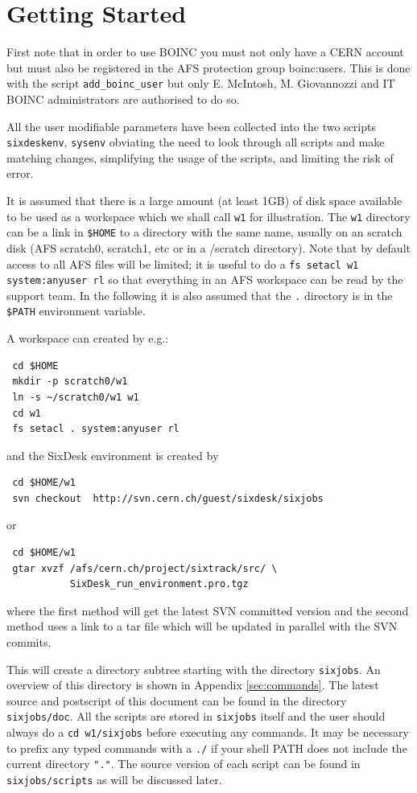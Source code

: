 \documentclass{cernatsnote}
\begin{document}
\section{Getting Started} First note that in order to use BOINC you must not
only have a CERN account but must also be registered in the AFS protection
group boinc:users. This is done with the script \texttt{add\_boinc\_user} but only
E. McIntosh, M. Giovannozzi and IT BOINC administrators are authorised to do
so.

All the user modifiable parameters have been collected into the two scripts
\texttt{sixdeskenv}, \texttt{sysenv} obviating the need to look through all scripts
and make matching changes, simplifying the usage of the scripts, and limiting
the risk of error.

It is assumed that there is a large amount (at least 1GB) of disk space
available to be used as a workspace which we shall call \texttt{w1} for
illustration. The \texttt{w1} directory can be a link in \texttt{\$HOME} to a
directory with the same name, usually on an scratch disk (AFS scratch0,
scratch1, etc or in a /scratch directory).  Note that by default access to all
AFS files will be limited; it is useful to do a {\tt fs setacl w1
system:anyuser rl} so that everything in an AFS workspace can be read by the
support team. In the following it is also assumed that the \texttt{.} directory is
in the \texttt{\$PATH} environment variable.

A workspace can created by e.g.:
\begin{verbatim}
 cd $HOME
 mkdir -p scratch0/w1
 ln -s ~/scratch0/w1 w1 
 cd w1
 fs setacl . system:anyuser rl
\end{verbatim}
and the SixDesk environment is created by
\begin{verbatim}
 cd $HOME/w1
 svn checkout  http://svn.cern.ch/guest/sixdesk/sixjobs
\end{verbatim}
or
\begin{verbatim}
 cd $HOME/w1
 gtar xvzf /afs/cern.ch/project/sixtrack/src/ \
           SixDesk_run_environment.pro.tgz
\end{verbatim}
where the first method will get the latest SVN committed version and the second
method uses a link to a tar file which will be updated in parallel with the SVN
commits.

This will create a directory subtree starting with the directory \texttt{sixjobs}.
An overview of this directory is shown in Appendix \ref{sec:commands}.  The
latest source and postscript of this document can be found in the directory
\texttt{sixjobs/doc}.  All the scripts are stored in \texttt{sixjobs} itself and the
user should always do a \texttt{cd w1/sixjobs} before executing any commands. It
may be necessary to prefix any typed commands with a \texttt{./} if your shell
PATH does not include the current directory \texttt{"."}.  The source version of
each script can be found in \texttt{sixjobs/scripts} as will be discussed later.
\end{document}
